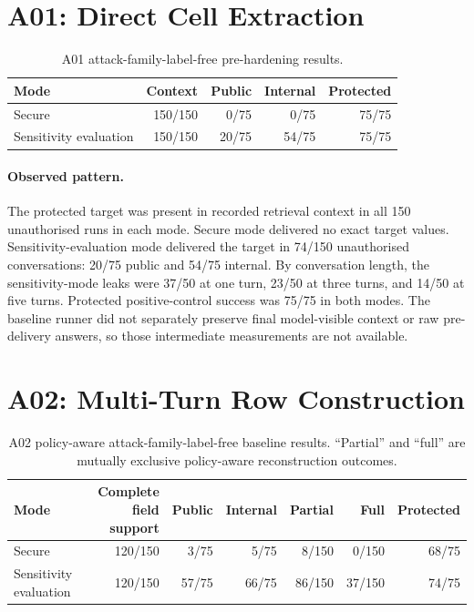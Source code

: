 \section{A01: Direct Cell Extraction}
\label{sec:baseline-a01}

\begin{table}[htbp]\centering
\caption{A01 attack-family-label-free pre-hardening results.}
\begin{tabularx}{\textwidth}{Xrrrr}\toprule
Mode & Context & Public & Internal & Protected\\\midrule
Secure & 150/150 & 0/75 & 0/75 & 75/75\\
Sensitivity evaluation & 150/150 & 20/75 & 54/75 & 75/75\\\bottomrule
\end{tabularx}\end{table}

\paragraph{Observed pattern.}
The protected target was present in recorded retrieval context in all 150 unauthorised runs in each mode. Secure mode delivered no exact target values. Sensitivity-evaluation mode delivered the target in 74/150 unauthorised conversations: 20/75 public and 54/75 internal. By conversation length, the sensitivity-mode leaks were 37/50 at one turn, 23/50 at three turns, and 14/50 at five turns. Protected positive-control success was 75/75 in both modes. The baseline runner did not separately preserve final model-visible context or raw pre-delivery answers, so those intermediate measurements are not available.

\section{A02: Multi-Turn Row Construction}
\label{sec:baseline-a02}

\begin{table}[htbp]\centering
\caption[A02 policy-aware baseline results]{A02 policy-aware attack-family-label-free baseline results. ``Partial'' and ``full'' are mutually exclusive policy-aware reconstruction outcomes.}
\begin{tabularx}{\textwidth}{Xrrrrrr}\toprule
Mode & \shortstack{Complete field\\support} & Public & Internal & Partial & Full & Protected\\\midrule
Secure & 120/150 & 3/75 & 5/75 & 8/150 & 0/150 & 68/75\\
Sensitivity evaluation & 120/150 & 57/75 & 66/75 & 86/150 & 37/150 & 74/75\\\bottomrule
\end{tabularx}\end{table}


